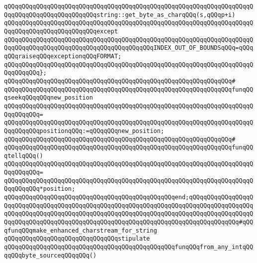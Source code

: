 \newline
\verb|qQQqqQQqqQQqqQQqqQQqqQQqqQQqqQQqqQQqqQQqqQQqqQQqqQQqqQQqqQQqqQQqqQQqqQQqqQQqqQQqqQQqqQQqqQQqqQQqstring::get_byte_as_charqQQq(s,qQQqp+i)|\newline
\verb|qQQqqQQqqQQqqQQqqQQqqQQqqQQqqQQqqQQqqQQqqQQqqQQqqQQqqQQqqQQqqQQqqQQqqQQqqQQqqQQqqQQqqQQqqQQqqQQqexcept|\newline
\verb|qQQqqQQqqQQqqQQqqQQqqQQqqQQqqQQqqQQqqQQqqQQqqQQqqQQqqQQqqQQqqQQqqQQqqQQqqQQqqQQqqQQqqQQqqQQqqQQqqQQqqQQqqQQqqQQqINDEX_OUT_OF_BOUNDSqQQq=qQQqqQQqraiseqQQqexceptionqQQqFORMAT;|\newline
\verb|qQQqqQQqqQQqqQQqqQQqqQQqqQQqqQQqqQQqqQQqqQQqqQQqqQQqqQQqqQQqqQQqqQQqqQQqqQQqqQQq};|\newline
\verb|qQQqqQQqqQQqqQQqqQQqqQQqqQQqqQQqqQQqqQQqqQQqqQQqqQQqqQQqqQQqqQQq#|\newline
\verb|qQQqqQQqqQQqqQQqqQQqqQQqqQQqqQQqqQQqqQQqqQQqqQQqqQQqqQQqqQQqqQQqfunqQQqseekqQQqqQQqnew_position|\newline
\verb|qQQqqQQqqQQqqQQqqQQqqQQqqQQqqQQqqQQqqQQqqQQqqQQqqQQqqQQqqQQqqQQqqQQqqQQqqQQqqQQq=|\newline
\verb|qQQqqQQqqQQqqQQqqQQqqQQqqQQqqQQqqQQqqQQqqQQqqQQqqQQqqQQqqQQqqQQqqQQqqQQqqQQqqQQqpositionqQQq:=qQQqqQQqnew_position;|\newline
\newline
\verb|qQQqqQQqqQQqqQQqqQQqqQQqqQQqqQQqqQQqqQQqqQQqqQQqqQQqqQQqqQQqqQQq#|\newline
\verb|qQQqqQQqqQQqqQQqqQQqqQQqqQQqqQQqqQQqqQQqqQQqqQQqqQQqqQQqqQQqqQQqfunqQQqtellqQQq()|\newline
\verb|qQQqqQQqqQQqqQQqqQQqqQQqqQQqqQQqqQQqqQQqqQQqqQQqqQQqqQQqqQQqqQQqqQQqqQQqqQQqqQQq=|\newline
\verb|qQQqqQQqqQQqqQQqqQQqqQQqqQQqqQQqqQQqqQQqqQQqqQQqqQQqqQQqqQQqqQQqqQQqqQQqqQQqqQQq*position;|\newline
\verb|qQQqqQQqqQQqqQQqqQQqqQQqqQQqqQQqqQQqqQQqqQQqqQQqend;qQQqqQQqqQQqqQQqqQQqqQQqqQQqqQQqqQQqqQQqqQQqqQQqqQQqqQQqqQQqqQQqqQQqqQQqqQQqqQQqqQQqqQQqqQQqqQQqqQQqqQQqqQQqqQQqqQQqqQQqqQQqqQQqqQQqqQQqqQQqqQQqqQQqqQQqqQQqqQQqqQQqqQQqqQQqqQQqqQQqqQQqqQQqqQQqqQQqqQQqqQQqqQQqqQQqqQQqqQQqqQQq#qQQqfunqQQqmake_enhanced_charstream_for_string|\newline
\newline
\verb|qQQqqQQqqQQqqQQqqQQqqQQqqQQqqQQqstipulate|\newline
\newline
\verb|qQQqqQQqqQQqqQQqqQQqqQQqqQQqqQQqqQQqqQQqqQQqqQQqfunqQQqfrom_any_intqQQqqQQqbyte_sourceqQQqqQQq()|\newline
